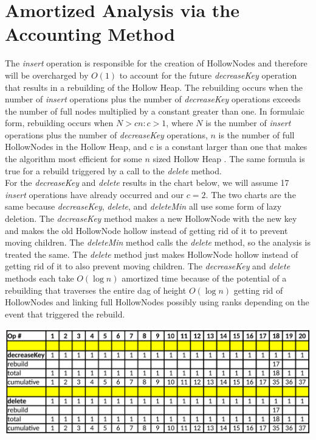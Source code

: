 \documentclass[letter,10pt]{article}
\begin{document}
\section{Amortized Analysis via the Accounting Method}
The \textit{insert} operation is responsible for the creation of HollowNodes and therefore will be overcharged by $O(1)$ to account for the future \textit{decreaseKey} operation that results in a rebuilding of the Hollow Heap. The rebuilding occurs when the number of \textit{insert} operations plus the number of \textit{decreaseKey} operations exceeds the number of full nodes multiplied by a constant greater than one. In formulaic form, rebuilding occurs when $N > cn: c > 1$, where $N$ is the number of \textit{insert} operations plus the number of \textit{decreaseKey} operations, $n$ is the number of full HollowNodes in the Hollow Heap, and c is a constant larger than one that makes the algorithm most efficient for some $n$ sized Hollow Heap \cite{hollow}. The same formula is true for a rebuild triggered by a call to the \textit{delete} method.\\

For the \textit{decreaseKey} and \textit{delete} results in the chart below, we will assume 17 \textit{insert} operations have already occurred and our $c = 2$. The two charts are the same because \textit{decreaseKey}, \textit{delete}, and \textit{deleteMin} all use some form of lazy deletion. The \textit{decreaseKey} method makes a new HollowNode with the new key and makes the old HollowNode hollow instead of getting rid of it to prevent moving children. The \textit{deleteMin} method calls the \textit{delete} method, so the analysis is treated the same. The \textit{delete} method just makes HollowNode hollow instead of getting rid of it to also prevent moving children. The \textit{decreaseKey} and \textit{delete} methods each take $O(\log n)$ amortized time because of the potential of a rebuilding that traverses the entire dag of height $O(\log n)$ getting rid of HollowNodes and linking full HollowNodes possibly using ranks depending on the event that triggered the rebuild.\\
\begin{center}
	\includegraphics[width=\textwidth]{accounting.png}
\end{center}
\end{document}
